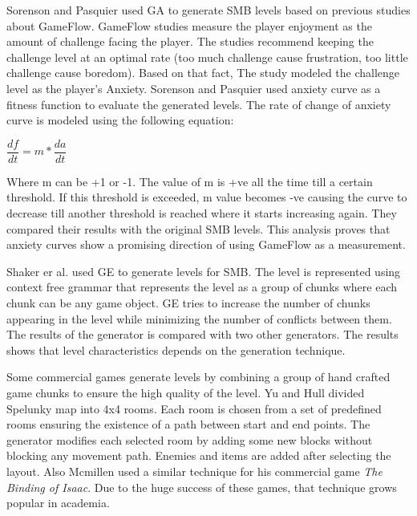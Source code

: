 Sorenson and Pasquier\cite{smbEvolutionFun} used GA to generate SMB levels based on previous studies about GameFlow\cite{gameFlow1, gameFlow2, gameFlow3}. GameFlow studies measure the player enjoyment as the amount of challenge facing the player. The studies recommend keeping the challenge level at an optimal rate (too much challenge cause frustration, too little challenge cause boredom). Based on that fact, The study modeled the challenge level as the player's Anxiety. Sorenson and Pasquier used anxiety curve as a fitness function to evaluate the generated levels. The rate of change of anxiety curve is modeled using the following equation:
\begin{center}
$\dfrac{df}{dt} = m * \dfrac{da}{dt}$
\end{center}
Where m can be +1 or -1. The value of m is +ve all the time till a certain threshold. If this threshold is exceeded, m value becomes -ve causing the curve to decrease till another threshold is reached where it starts increasing again. They compared their results with the original SMB levels. This analysis proves that anxiety curves show a promising direction of using GameFlow as a measurement.\\\par

Shaker er al.\cite{grammarSMB} used GE to generate levels for SMB. The level is represented using context free grammar that represents the level as a group of chunks where each chunk can be any game object. GE tries to increase the number of chunks appearing in the level while minimizing the number of conflicts between them. The results of the generator is compared with two other generators. The results shows that level characteristics depends on the generation technique.\\\par

Some commercial games generate levels by combining a group of hand crafted game chunks to ensure the high quality of the level. Yu and Hull\cite{spelunkyTechnique} divided Spelunky map into 4x4 rooms. Each room is chosen from a set of predefined rooms ensuring the existence of a path between start and end points. The generator modifies each selected room by adding some new blocks without blocking any movement path. Enemies and items are added after selecting the layout. Also Mcmillen\cite{theBindingOfIsaacTechnique} used a similar technique for his commercial game \emph{The Binding of Isaac}. Due to the huge success of these games, that technique grows popular in academia.\\\par

